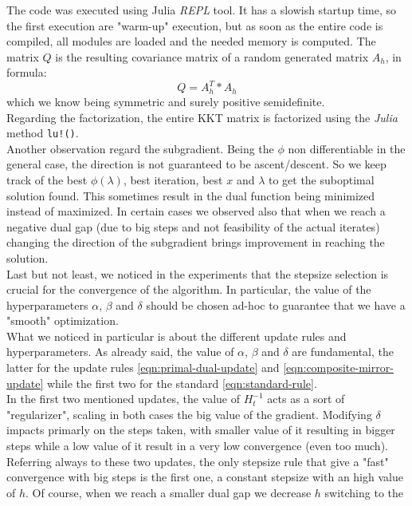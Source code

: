 \documentclass[notitlepage]{article}
\begin{document}
The code was executed using Julia \textit{REPL} tool. It has a slowish startup time, so the first execution are "warm-up" execution, but as soon as the entire code is compiled, all modules are loaded and the needed memory is computed. 
The matrix $Q$ is the resulting covariance matrix of a random generated matrix $A_h$, in formula: 
\[
  Q = A_h^T * A_h  
\]
which we know being symmetric and surely positive semidefinite.\\
Regarding the factorization, the entire KKT matrix is factorized using the \textit{Julia} method \texttt{lu!()}.\\
Another observation regard the subgradient. Being the $\phi$ non differentiable in the general case, the direction is not guaranteed to be ascent/descent. So we keep track of the best $\phi(\lambda)$, best iteration, best $x$ 
and $\lambda$ to get the suboptimal solution found. This sometimes result in the dual function being minimized instead of maximized. In certain cases we observed also that when we reach a negative dual gap (due to big steps and not feasibility of the
actual iterates) changing the direction of the subgradient brings improvement in reaching the solution.\\
Last but not least, we noticed in the experiments that the stepsize selection is crucial for the convergence of the algorithm. In particular, the value of the hyperparameters $\alpha$, $\beta$ and $\delta$ should be chosen ad-hoc to guarantee 
that we have a "smooth" optimization.\\
What we noticed in particular is about the different update rules and hyperparameters. As already said, the value of $\alpha$, $\beta$ and $\delta$ are fundamental, the latter for the update rules \eqref{eqn:primal-dual-update} 
and \eqref{eqn:composite-mirror-update} while the first two for the standard \eqref{eqn:standard-rule}.\\
In the first two mentioned updates, the value of $H_t^{-1}$ acts as a sort of "regularizer", scaling in both cases the big value of the gradient. Modifying $\delta$ impacts primarly on the steps taken, with smaller value of it resulting in 
bigger steps while a low value of it result in a very low convergence (even too much).\\
Referring always to these two updates, the only stepsize rule that give a "fast" convergence with big steps is the first one, a constant stepsize with an high value of $h$. Of course, when we reach a smaller dual gap we decrease $h$ switching to the 
\end{document}
